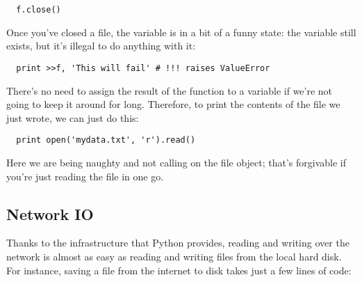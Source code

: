 \documentclass[letterpaper, 12pt, titlepage, twoside]{article}
\begin{document}
\begin{lstlisting}
  f.close()
\end{lstlisting}

Once you've closed a file, the  variable is in a bit of a funny state:
the variable still exists, but it's illegal to do anything with it:

\begin{lstlisting}
  print >>f, 'This will fail' # !!! raises ValueError
\end{lstlisting}

There's no need to assign the result of the  function to a variable
if we're not going to keep it around for long. Therefore, to print the
contents of the file we just wrote, we can just do this:

\begin{lstlisting}
  print open('mydata.txt', 'r').read()
\end{lstlisting}

Here we are being naughty and not calling  on the file object;
that's forgivable if you're just reading the file in one go.


\subsection*{Network IO}

Thanks to the infrastructure that Python provides, reading and writing over
the network is almost as easy as reading and writing files from the local hard
disk. For instance, saving a file from the internet to disk takes just a few
lines of code:
\end{document}
